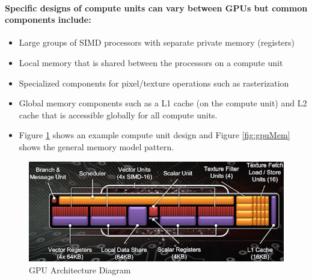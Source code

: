 \documentclass[a4paper,10pt,twoside]{article}
\begin{document}
\paragraph{Specific designs of compute units can vary between GPUs but common components include:}
\begin{itemize}
\item Large groups of SIMD processors with separate private memory (registers) 
\item Local memory that is shared between the processors on a compute unit
\item Specialized components for pixel/texture operations such as rasterization
\item Global memory components such as a L1 cache (on the compute unit) and L2 cache that is accessible globally for all compute units.
\item Figure \ref{fig:gpuArch} shows an example compute unit design and Figure \ref{fig:gpuMem} shows the general memory model pattern.
\end{itemize}
	\begin{figure}[H]
	\includegraphics[width=\linewidth,height=\paperheight,keepaspectratio]{gpuArch.jpg}
	\caption{GPU Architecture Diagram}
	\label{fig:gpuArch}
	\end{figure}
	
\end{document}

